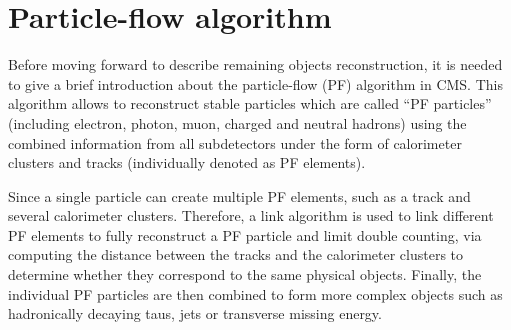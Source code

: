 \section{Particle-flow algorithm}\label{sec:PF_algorithm}
Before moving forward to describe remaining objects reconstruction, it is needed to give a brief introduction about the particle-flow (PF) algorithm \cite{PF_1,PF_2} in CMS. This algorithm allows to reconstruct stable particles which are called ``PF particles'' (including electron, photon, muon, charged and neutral hadrons) using the combined information from all subdetectors under the form of calorimeter clusters and tracks (individually denoted as PF elements).

Since a single particle can create multiple PF elements, such as a track and several calorimeter clusters. Therefore, a link algorithm is used to link different PF elements to fully reconstruct a PF particle and limit double counting, via computing the distance between the tracks and the calorimeter clusters to determine whether they correspond to the same physical objects. Finally, the individual PF particles are then combined to form more complex objects such as hadronically decaying taus, jets or transverse missing energy.

